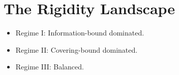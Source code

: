 \section{The Rigidity Landscape}

\begin{itemize}
\item Regime I: Information-bound dominated.
\item Regime II: Covering-bound dominated.
\item Regime III: Balanced.
\end{itemize}
